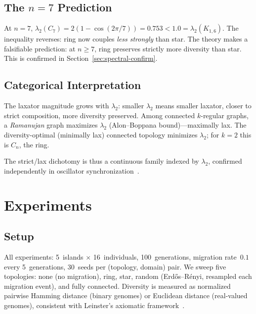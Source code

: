 \documentclass[submission,copyright,creativecommons]{eptcs}
\begin{document}
\subsection{The \texorpdfstring{$n{=}7$}{n=7} Prediction}

At $n{=}7$, $\lambda_2(C_7) = 2(1 - \cos(2\pi/7)) = 0.753 < 1.0 =
\lambda_2(K_{1,6})$. The inequality reverses: ring now couples
\emph{less strongly} than star. The theory makes a falsifiable
prediction: at $n \geq 7$, ring preserves strictly more diversity
than star. This is confirmed in Section~\ref{sec:spectral-confirm}.

\subsection{Categorical Interpretation}

The laxator magnitude grows with $\lambda_2$: smaller $\lambda_2$
means smaller laxator, closer to strict composition, more diversity
preserved. Among connected $k$-regular graphs, a \emph{Ramanujan}
graph maximizes $\lambda_2$ (Alon--Boppana bound)---maximally lax.
The diversity-optimal (minimally lax) connected topology minimizes
$\lambda_2$; for $k{=}2$ this is $C_n$, the ring.

The strict/lax dichotomy is thus a continuous family indexed by
$\lambda_2$, confirmed independently in oscillator
synchronization~\cite{sanz2026algebraic}.

\section{Experiments}
\label{sec:experiments}

\subsection{Setup}

All experiments: 5~islands $\times$ 16~individuals, 100~generations,
migration rate~$0.1$ every 5~generations, 30~seeds per
(topology, domain) pair. We sweep five topologies: none (no migration),
ring, star, random (Erd\H{o}s--R\'{e}nyi, resampled each migration
event), and fully connected. Diversity is measured as normalized
pairwise Hamming distance (binary genomes) or Euclidean distance
(real-valued genomes), consistent with Leinster's axiomatic
framework~\cite{leinster2021entropy}.
\end{document}
